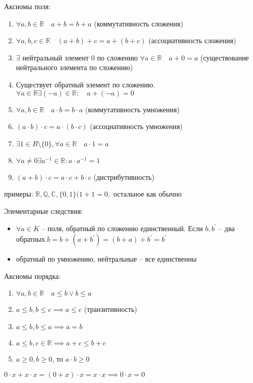 \documentclass{book}
\newcommand\R{\ensuremath{\mathbb{R}}}
\newcommand\Q{\ensuremath{\mathbb{Q}}}
\renewcommand\C{\ensuremath{\mathbb{C}}}
\newcommand{\p}[1]{#1^{\prime}}
\theoremstyle{definition}
\begin{document}
        Аксиомы поля:
        \begin{enumerate}
            \item $\forall a, b\in \R\quad a+b=b+a$ (коммутативность сложения)
            \item $\forall a, b, c\in \R\quad (a+b)+c = a+(b+c)$ (ассоциативность сложения)
            \item $\exists $ нейтральный элемент $0$ по сложению $\forall a\in \R\quad a+0=a$ (существование нейтрального элемента по сложению)
            \item Существует обратный элемент по сложению. $\forall a\in \R \exists (-a)\in \R: \quad a+(-a) = 0$
            \item $\forall a, b\in \R\quad a\cdot b = b\cdot a$ (коммутативность умножения)
            \item $(a\cdot b)\cdot c = a\cdot (b\cdot c)$ (ассоциативность умножения)
            \item $\exists 1\in R\setminus \{0\}, \forall a\in \R\quad a\cdot 1 = a$
            \item $\forall a\neq 0 \exists  a^{-1}\in \R: a\cdot a^{-1} = 1$
            \item $(a+b)\cdot c = a\cdot c + b\cdot c$ (дистрибутивность)
        \end{enumerate}
        примеры: $\R, \Q, \C, \{0,1\} (1+1=0,\text{ остальное как обычно}$

        Элементарные следствия:
        \begin{itemize}
            \item $\forall a\in K$ -- поля, обратный по сложению единственный. Если $b, \p b$ -- два обратных.$b= b+(a+\p b)=(b+a)+\p b = \p b$
            \item обратный по умножению, нейтральные -- все единственны
        \end{itemize}
        Аксиомы порядка:
        \begin{enumerate}
            \item $\forall a, b\in \R\quad a\leqslant b \vee b\leqslant a$
            \item $a\leqslant b, b\leqslant c \implies a\leqslant c$ (транзитивность)
            \item $a\leqslant b, b\leqslant a \implies a=b$ 
            \item $a\leqslant b, c\in \R\implies a+c\leqslant b+c$
            \item $a\geqslant 0, b\geqslant 0$, то $a\cdot b\geqslant 0$
        \end{enumerate}
        $0\cdot x + x\cdot x = (0+x)\cdot x = x\cdot x \implies  0\cdot x = 0$
\end{document}

